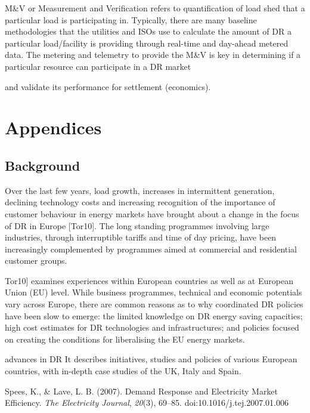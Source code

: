 \documentclass{llncs}
\begin{document}
M{\&}V or Measurement and Verification refers to quantification of load shed
that a particular load is participating in. Typically, there are many
baseline methodologies that the utilities and ISOs use to calculate the
amount of DR a particular load/facility is providing through real-time and
day-ahead metered data. The metering and telemetry to provide the M{\&}V is
key in determining if a particular resource can participate in a DR market

and validate its performance for settlement (economics).

\newpage



%

%
%

%

\section{Appendices}

\subsection{Background}

Over the last few years, load growth, increases in intermittent generation,
declining technology costs and increasing recognition of the importance of
customer behaviour in energy markets have brought about a change in the
focus of DR in Europe [Tor10]. The long standing programmes involving large
industries, through interruptible tariffs and time of day pricing, have been
increasingly complemented by programmes aimed at commercial and residential
customer groups.

\cite{torriti_demand_2010} Tor10] examines experiences within European countries as well as at
European Union (EU) level. While business programmes, technical and economic
potentials vary across Europe, there are common reasons as to why
coordinated DR policies have been slow to emerge: the limited knowledge on
DR energy saving capacities; high cost estimates for DR technologies and
infrastructures; and policies focused on creating the conditions for
liberalising the EU energy markets.


advances in DR It describes initiatives, studies and policies of various
European countries, with in-depth case studies of the UK, Italy and Spain.

Spees, K., {\&} Lave, L. B. (2007). Demand Response and Electricity Market
Efficiency. \textit{The Electricity Journal}, \textit{20}(3), 69--85. doi:10.1016/j.tej.2007.01.006
\end{document}
